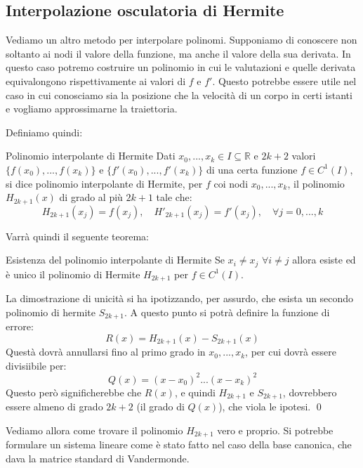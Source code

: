 \documentclass[a4paper,11pt]{article}
\begin{document}
\subsection{Interpolazione osculatoria di Hermite}
Vediamo un altro metodo per interpolare polinomi.
Supponiamo di conoscere non soltanto ai nodi il valore della funzione, ma anche il valore della sua derivata.
In questo caso potremo costruire un polinomio in cui le valutazioni e quelle derivata equivalongono rispettivamente ai valori di $f$ e $f'$.
Questo potrebbe essere utile nel caso in cui conosciamo sia la posizione che la velocità di un corpo in certi istanti e vogliamo approssimarne la traiettoria.

Definiamo quindi:
\begin{definition}{Polinomio interpolante di Hermite }
	Dati $x_0, ..., x_k \in I \subseteq \mathbb{R}$ e $2k + 2$ valori $\{f(x_0), ..., f(x_k) \}$ e $\{ f'(x_0), ..., f'(x_k) \}$ di una certa funzione $f \in C^{1}(I)$, si dice polinomio interpolante di Hermite, per $f$ coi nodi $x_0, ..., x_k$, il polinomio $H_{2k + 1}(x)$ di grado al più $2k + 1$ tale che:
	$$
		H_{2k + 1}(x_j) = f(x_j), \quad H'_{2k + 1}(x_j) = f'(x_j), \quad \forall j = 0, ..., k
	$$
\end{definition}

Varrà quindi il seguente teorema:
\begin{theorem}{Esistenza del polinomio interpolante di Hermite}
	Se $x_i \neq x_j$ $\forall i \neq j$ allora esiste ed è unico il polinomio di Hermite $H_{2k + 1}$ per $f \in C^1(I)$. 
\end{theorem}
La dimostrazione di unicità si ha ipotizzando, per assurdo, che esista un secondo polinomio di hermite $S_{2k+1}$.
A questo punto si potrà definire la funzione di errore:
$$
R(x) = H_{2k + 1}(x) - S_{2k + 1}(x)
$$
Questà dovrà annullarsi fino al primo grado in $x_0, ..., x_k$, per cui dovrà essere divisiibile per:
$$
Q(x) = (x - x_0)^2 ... (x - x_k)^2
$$
Questo però significherebbe che $R(x)$, e quindi $H_{2k + 1}$ e $S_{2k + 1}$, dovrebbero essere almeno di grado $2k + 2$ (il grado di $Q(x)$), che viola le ipotesi. \qed 

\par\smallskip

Vediamo allora come trovare il polinomio $H_{2k + 1}$ vero e proprio.
Si potrebbe formulare un sistema lineare come è stato fatto nel caso della base canonica, che dava la matrice standard di Vandermonde.
\end{document}
